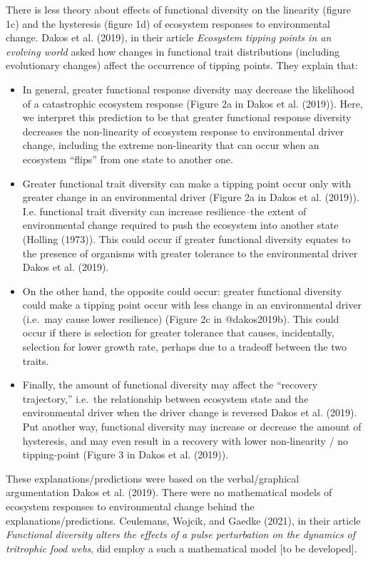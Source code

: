 \documentclass{article}
\begin{document}
There is less theory about effects of functional diversity on the
linearity (figure 1c) and the hysteresis (figure 1d) of ecosystem
responses to environmental change. Dakos et al. (2019), in their article
\emph{Ecosystem tipping points in an evolving world} asked how changes
in functional trait distributions (including evolutionary changes)
affect the occurrence of tipping points. They explain that:

\begin{itemize}
\item
  In general, greater functional response diversity may decrease the
  likelihood of a catastrophic ecosystem response (Figure 2a in Dakos et
  al. (2019)). Here, we interpret this prediction to be that greater
  functional response diversity decreases the non-linearity of ecosystem
  response to environmental driver change, including the extreme
  non-linearity that can occur when an ecosystem ``flips'' from one
  state to another one.
\item
  Greater functional trait diversity can make a tipping point occur only
  with greater change in an environmental driver (Figure 2a in Dakos et
  al. (2019)). I.e. functional trait diversity can increase
  resilience--the extent of environmental change required to push the
  ecosystem into another state (Holling (1973)). This could occur if
  greater functional diversity equates to the presence of organisms with
  greater tolerance to the environmental driver Dakos et al. (2019).
\item
  On the other hand, the opposite could occur: greater functional
  diversity could make a tipping point occur with less change in an
  environmental driver (i.e.~may cause lower resilience) (Figure 2c in
  @dakos2019b). This could occur if there is selection for greater
  tolerance that causes, incidentally, selection for lower growth rate,
  perhaps due to a tradeoff between the two traits.
\item
  Finally, the amount of functional diversity may affect the ``recovery
  trajectory,'' i.e.~the relationship between ecosystem state and the
  environmental driver when the driver change is reversed Dakos et al.
  (2019). Put another way, functional diversity may increase or decrease
  the amount of hysteresis, and may even result in a recovery with lower
  non-linearity / no tipping-point (Figure 3 in Dakos et al. (2019)).
\end{itemize}

These explanations/predictions were based on the verbal/graphical
argumentation Dakos et al. (2019). There were no mathematical models of
ecosystem responses to environmental change behind the
explanations/predictions. Ceulemans, Wojcik, and Gaedke (2021), in their
article \emph{Functional diversity alters the effects of a pulse
perturbation on the dynamics of tritrophic food webs}, did employ a such
a mathematical model {[}to be developed{]}.
\end{document}
